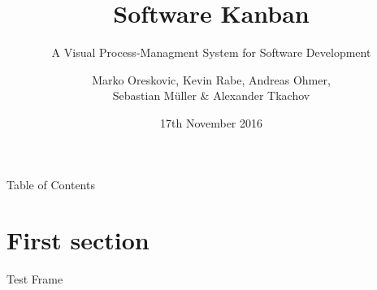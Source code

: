 \documentclass[14pt,t]{beamer}
\title{Software Kanban}
\subtitle{A Visual Process-Managment System for Software Development}
\author{{\footnotesize Marko Oreskovic, Kevin Rabe, Andreas Ohmer,\\ Sebastian Müller \& Alexander Tkachov}}
\institute{Frankfurt University of Applied Sciences}
\date{\small 17th November 2016}
\begin{document}
	\maketitle
	
	\begin{frame}{Table of Contents}
		\tableofcontents[hideallsubsections]
	\end{frame}
	
	\section{First section}
		\begin{frame}{\secname}
			Test Frame
		\end{frame}
	
\end{document}
